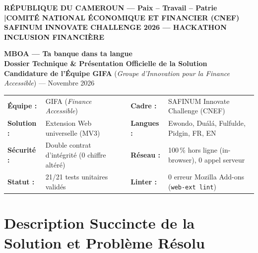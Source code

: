 \documentclass[10pt,a4paper]{article}
\begin{document}
\thispagestyle{plain}
\begin{center}
  \textbf{\footnotesize RÉPUBLIQUE DU CAMEROUN --- Paix -- Travail -- Patrie \quad|\quad COMITÉ NATIONAL ÉCONOMIQUE ET FINANCIER (CNEF)}\\[-0.1cm]
  \textbf{\scriptsize SAFINUM INNOVATE CHALLENGE 2026 --- HACKATHON INCLUSION FINANCIÈRE}\\[0.15cm]

  \begin{tcolorbox}[colback=mboateal!8!white, colframe=mboateal, arc=2.5mm, boxrule=1.2pt, width=\textwidth, top=2mm, bottom=2mm]
    \centering
    {\LARGE \textbf{\color{mboateal} MBOA --- Ta banque dans ta langue}}\\[0.1cm]
    {\normalsize \textbf{\color{mboadark} Dossier Technique \& Présentation Officielle de la Solution}}\\[0.05cm]
    {\footnotesize \textbf{Candidature de l'Équipe GIFA} (\textit{Groupe d'Innovation pour la Finance Accessible}) --- Novembre 2026}
  \end{tcolorbox}
\end{center}

\vspace{-0.2cm}
\begin{infobox}
\small
\begin{tabularx}{\textwidth}{lXlX}
\textbf{Équipe :} & GIFA (\textit{Finance Accessible}) & \textbf{Cadre :} & SAFINUM Innovate Challenge (CNEF) \\
\textbf{Solution :} & Extension Web universelle (MV3) & \textbf{Langues :} & Ewondo, Duálá, Fulfulde, Pidgin, FR, EN \\
\textbf{Sécurité :} & Double contrat d'intégrité (0 chiffre altéré) & \textbf{Réseau :} & 100\,\% hors ligne (in-browser), 0 appel serveur \\
\textbf{Statut :} & 21/21 tests unitaires validés & \textbf{Linter :} & 0 erreur Mozilla Add-ons (\texttt{web-ext lint}) \\
\end{tabularx}
\end{infobox}

\section{Description Succincte de la Solution et Problème Résolu}
\end{document}
